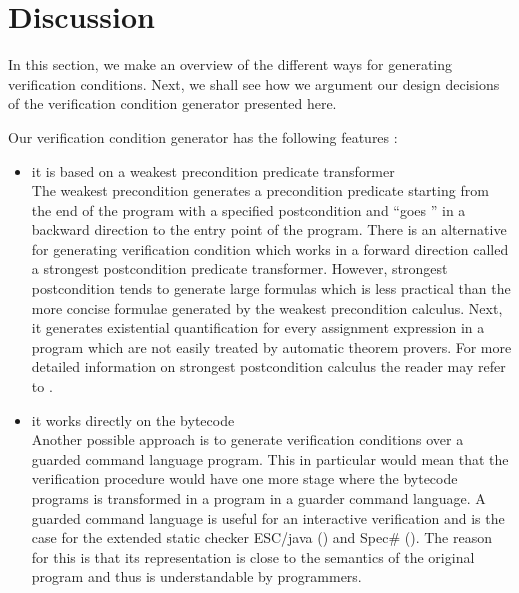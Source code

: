 \section{Discussion}\label{wp:discussionVC}


In this section, we make an overview of the different ways for generating verification conditions. 
Next, we shall see how we argument our design decisions of the verification condition
 generator presented here. 

Our verification condition generator has the following features :

\begin{itemize}
  \item it is based on a weakest precondition predicate transformer \\
    The weakest precondition generates a precondition predicate starting 
    from the end of the program with a specified postcondition and ``goes '' in a backward
    direction to the entry point of the program. There is an alternative for generating
    verification condition  which works in a forward direction called a strongest postcondition
    predicate transformer. However, strongest postcondition tends to generate large formulas which is less practical than the more concise
    formulae generated by the  weakest precondition calculus.
    Next, it generates existential quantification for every assignment expression in a program which
    are not easily treated by automatic theorem provers.  
    For more detailed information on strongest postcondition calculus the reader may refer to  \cite{WPCDS}.
 


  \item it works directly on the bytecode \\
        Another possible approach is to generate verification conditions over a guarded command language program.
	This in particular would mean that the verification procedure would have one more stage where
	the bytecode programs is transformed in a program in a guarder command language.
	A guarded command language is useful for an interactive verification and is the case for the extended static checker
	ESC/java (\cite{escjava}) and Spec\# (\cite{BLS04sp}). The reason for this is that its representation is close to the semantics of the original
	program and thus is understandable by programmers.
	

\end{itemize}
